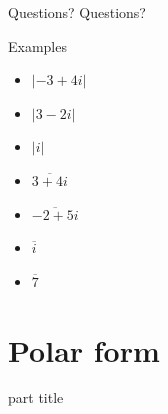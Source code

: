 \documentclass{beamer}
\begin{document}
\begin{frame}{Questions?}
Questions?
\end{frame}

\begin{frame}{Examples}
\begin{example}
	\begin{itemize}
		\item $|-3+4i|$
		\item $|3-2i|$
		\item $|i|$
	\end{itemize}
\end{example}
\begin{example}
\begin{itemize}
\item $\overline{3+4i}$
\item $\overline{-2+5i}$
\item $\overline{i}$
\item $\overline{7}$
\end{itemize}
\end{example}
\end{frame}

\section{Polar form}

\begin{frame}
\begin{beamercolorbox}[sep=12pt,center]{part title}
\insertsection\par
\end{beamercolorbox}
\end{frame}
\end{document}

